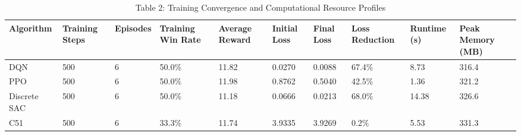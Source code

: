 \begin{table}
\caption{Table 2: Training Convergence and Computational Resource Profiles}
\label{tab:table_training_results}
\begin{tabular}{llllllllll}
\toprule
Algorithm & Training Steps & Episodes & Training Win Rate & Average Reward & Initial Loss & Final Loss & Loss Reduction & Runtime (s) & Peak Memory (MB) \\
\midrule
DQN & 500 & 6 & 50.0\% & 11.82 & 0.0270 & 0.0088 & 67.4\% & 8.73 & 316.4 \\
PPO & 500 & 6 & 50.0\% & 11.98 & 0.8762 & 0.5040 & 42.5\% & 1.36 & 321.2 \\
Discrete SAC & 500 & 6 & 50.0\% & 11.18 & 0.0666 & 0.0213 & 68.0\% & 14.38 & 326.6 \\
C51 & 500 & 6 & 33.3\% & 11.74 & 3.9335 & 3.9269 & 0.2\% & 5.53 & 331.3 \\
\bottomrule
\end{tabular}
\end{table}

